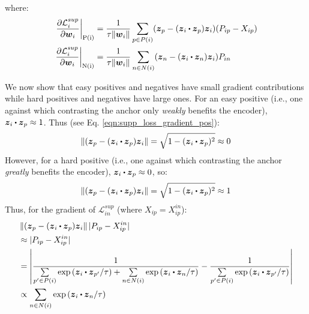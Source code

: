 where:
\begin{align}
  \left.\frac{\partial\mathcal{L}_i^{sup}}{\partial\boldsymbol{w}_i}\right\vert_\text{P(i)} & =
  \frac{1}{\tau\Vert\boldsymbol{w}_i\Vert}\sum_{p\in P(i)}(\boldsymbol{z}_p-(\boldsymbol{z}_i\bigcdot\boldsymbol{z}_p)\boldsymbol{z}_i)(P_{ip}-X_{ip})\label{eqn:supp_loss_gradient_pos}\\
  \left.\frac{\partial\mathcal{L}_i^{sup}}{\partial\boldsymbol{w}_i}\right\vert_\text{N(i)} & =
  \frac{1}{\tau\Vert\boldsymbol{w}_i\Vert}\sum_{n\in N(i)}(\boldsymbol{z}_n-(\boldsymbol{z}_i\bigcdot\boldsymbol{z}_n)\boldsymbol{z}_i)P_{in}\label{eqn:supp_loss_gradient_neg}
\end{align}

We now show that easy positives and negatives have small gradient contributions while hard positives and negatives have large ones. For an easy positive (i.e., one against which contrasting the anchor only \emph{weakly} benefits the encoder), $\boldsymbol{z}_i\bigcdot\boldsymbol{z}_p\approx 1$. Thus (see Eq. \ref{eqn:supp_loss_gradient_pos}):
\begin{equation}
  \left\Vert(\boldsymbol{z}_p-(\boldsymbol{z}_i\bigcdot\boldsymbol{z}_p)\boldsymbol{z}_i\right\Vert=\sqrt{1-(\boldsymbol{z}_i\bigcdot\boldsymbol{z}_p)^2}\approx 0
\end{equation}
However, for a hard positive (i.e., one against which contrasting the anchor \emph{greatly} benefits the encoder), $\boldsymbol{z}_i\bigcdot\boldsymbol{z}_p\approx 0$, so:
\begin{equation}
  \left\Vert(\boldsymbol{z}_p-(\boldsymbol{z}_i\bigcdot\boldsymbol{z}_p)\boldsymbol{z}_i\right\Vert=\sqrt{1-(\boldsymbol{z}_i\bigcdot\boldsymbol{z}_p)^2}\approx 1
\end{equation}
Thus, for the gradient of $\mathcal{L}_{in}^{sup}$ (where $X_{ip}=X_{ip}^{in}$):
\begin{align}
  & \left\Vert(\boldsymbol{z}_p-(\boldsymbol{z}_i\bigcdot\boldsymbol{z}_p)\boldsymbol{z}_i\right\Vert|P_{ip}-X_{ip}^{in}|\nonumber\\
  & \approx |P_{ip}-X_{ip}^{in}|\nonumber\\
  & = \left|\frac{1}{\sum\limits_{p'\in P(i)}\text{exp}\left(\boldsymbol{z}_i\bigcdot\boldsymbol{z}_{p'}/\tau\right)+\sum\limits_{n\in N(i)}\text{exp}\left(\boldsymbol{z}_i\bigcdot\boldsymbol{z}_n/\tau\right)}-\frac{1}{\sum\limits_{p'\in P(i)}\text{exp}\left(\boldsymbol{z}_i\bigcdot\boldsymbol{z}_{p'}/\tau\right)}\right|\nonumber\\
  & \propto \sum_{n\in N(i)}\text{exp}\left(\boldsymbol{z}_i\bigcdot\boldsymbol{z}_n/\tau\right)
  \label{eqn:supp_bad_supcon_factor}
\end{align}
